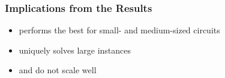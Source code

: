 \begin{frame}
    \frametitle{Implications from the Results}
    \begin{itemize}
        \item \bddsp performs the best for small- and medium-sized circuits
              \pause
        \item \approxmc uniquely solves large instances
              \pause
        \item \cachet and \dcssat do not scale well
    \end{itemize}
\end{frame}